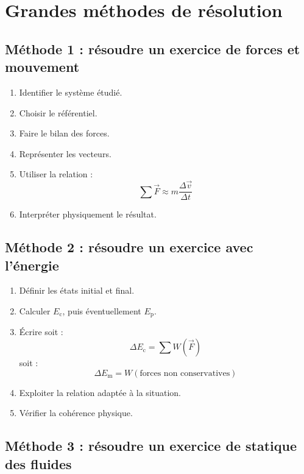 \documentclass[11pt,a4paper]{article}
\newcommand{\Ec}{E_\mathrm{c}}
\newcommand{\Ep}{E_\mathrm{p}}
\newcommand{\Em}{E_\mathrm{m}}
\begin{document}
\section{Grandes méthodes de résolution}

\subsection{Méthode 1 : résoudre un exercice de forces et mouvement}

\begin{methodebox}
\begin{enumerate}
    \item Identifier le système étudié.
    \item Choisir le référentiel.
    \item Faire le bilan des forces.
    \item Représenter les vecteurs.
    \item Utiliser la relation :
    \[
    \sum \vec{F}\approx m\frac{\Delta \vec{v}}{\Delta t}
    \]
    \item Interpréter physiquement le résultat.
\end{enumerate}
\end{methodebox}

\subsection{Méthode 2 : résoudre un exercice avec l'énergie}

\begin{methodebox}
\begin{enumerate}
    \item Définir les états initial et final.
    \item Calculer $\Ec$, puis éventuellement $\Ep$.
    \item Écrire soit :
    \[
    \Delta \Ec = \sum W(\vec{F})
    \]
    soit :
    \[
    \Delta \Em = W(\text{forces non conservatives})
    \]
    \item Exploiter la relation adaptée à la situation.
    \item Vérifier la cohérence physique.
\end{enumerate}
\end{methodebox}

\subsection{Méthode 3 : résoudre un exercice de statique des fluides}
\end{document}
